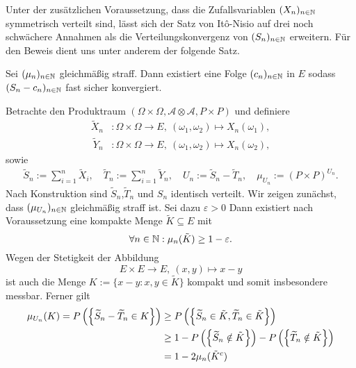 Unter der zusätzlichen Voraussetzung, dass die Zufallsvariablen $(X_n)_{n \in \mathbb{N}}$  symmetrisch verteilt sind, lässt sich der Satz von Itô-Nisio auf drei noch schwächere Annahmen als die Verteilungskonvergenz von $(S_n)_{n \in \mathbb{N}}$ erweitern. 
Für den Beweis dient uns unter anderem der folgende Satz. 
\begin{theorem}
    Sei $(\mu_n)_{n \in \mathbb{N}}$ gleichmäßig straff. Dann existiert eine Folge $(c_n)_{n \in \mathbb{N}}$ in $E$ sodass $(S_n - c_n)_{n \in \mathbb{N}}$ fast sicher konvergiert.
\end{theorem}

\begin{proof*}
    Betrachte den Produktraum $(\Omega \times \Omega, \mathcal{A} \otimes \mathcal{A}, P \times P)$ und definiere 
    \begin{align*}
        \widetilde{X}_n&: \Omega \times \Omega \to E, \ (\omega_1, \omega_2) \mapsto X_n(\omega_1), \\\
        \widetilde{Y}_n&: \Omega \times \Omega \to E, \ (\omega_1, \omega_2) \mapsto X_n(\omega_2),
    \end{align*}
    sowie 
    \begin{align*}
        \widetilde{S}_n := \sum_{i = 1}^n \widetilde{X}_i, \quad \widetilde{T}_n := \sum_{i = 1}^n \widetilde{Y}_n, \quad U_n := \widetilde{S}_n - \widetilde{T}_n, \quad \mu_{U_n} := (P\times P)^{U_n}. 
    \end{align*}
    Nach Konstruktion sind $\widetilde{S}_n$,$\widetilde{T}_n$ und $S_n$ identisch verteilt. Wir zeigen zunächst, dass $(\mu_{U_n})_{n \in \mathbb{N}}$ gleichmäßig straff ist. 
    Sei dazu $\varepsilon > 0$ Dann existiert nach Voraussetzung eine kompakte Menge $\tilde{K} \subseteq E$ mit 
    $$
        \forall n \in \mathbb{N}: \mu_n(\tilde{K}) \geq 1 - \varepsilon. 
    $$
    Wegen der Stetigkeit der Abbildung 
    $$
        E \times E \to E, \ (x,y) \mapsto x - y
    $$
    ist auch die Menge $K := \{ x - y : x,y \in \tilde{K}\}$ kompakt und somit insbesondere messbar. Ferner gilt
    \begin{align*}
        \mu_{U_n}(K) = \prob{\widetilde{S}_n - \widetilde{T}_n \in K} &\geq \prob{\widetilde{S}_n \in \tilde{K}, \widetilde{T}_n \in \tilde{K}} \\\
                                                              &\geq 1 - \prob{\widetilde{S}_n \notin \tilde{K}} - \prob{\widetilde{T}_n \notin \tilde{K}} \\\
                                                              &= 1 - 2\mu_n(\tilde{K}^c) \\\

\end{align*}
\end{proof*}
